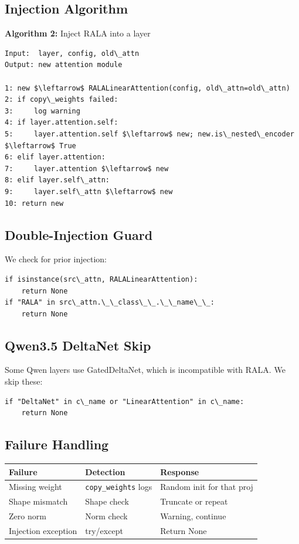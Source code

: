 \subsection{Injection Algorithm}

\textbf{Algorithm 2:} Inject RALA into a layer
\begin{lstlisting}
Input:  layer, config, old\_attn
Output: new attention module

1: new $\leftarrow$ RALALinearAttention(config, old\_attn=old\_attn)
2: if copy\_weights failed:
3:     log warning
4: if layer.attention.self:
5:     layer.attention.self $\leftarrow$ new; new.is\_nested\_encoder $\leftarrow$ True
6: elif layer.attention:
7:     layer.attention $\leftarrow$ new
8: elif layer.self\_attn:
9:     layer.self\_attn $\leftarrow$ new
10: return new
\end{lstlisting}

\subsection{Double-Injection Guard}

We check for prior injection:

\begin{lstlisting}
if isinstance(src\_attn, RALALinearAttention):
    return None
if "RALA" in src\_attn.\_\_class\_\_.\_\_name\_\_:
    return None
\end{lstlisting}

\subsection{Qwen3.5 DeltaNet Skip}

Some Qwen layers use GatedDeltaNet, which is incompatible with RALA. We 
skip these:

\begin{lstlisting}
if "DeltaNet" in c\_name or "LinearAttention" in c\_name:
    return None
\end{lstlisting}

\subsection{Failure Handling}

\begin{table}[H]
\centering
\small
\begin{tabular}{lll}
\toprule
\textbf{Failure} & \textbf{Detection} & \textbf{Response} \\
\midrule
Missing weight & \texttt{copy\_weights} logs & Random init for that proj \\
Shape mismatch & Shape check & Truncate or repeat \\
Zero norm & Norm check & Warning, continue \\
Injection exception & try/except & Return None \\
\bottomrule
\end{tabular}
\end{table}

